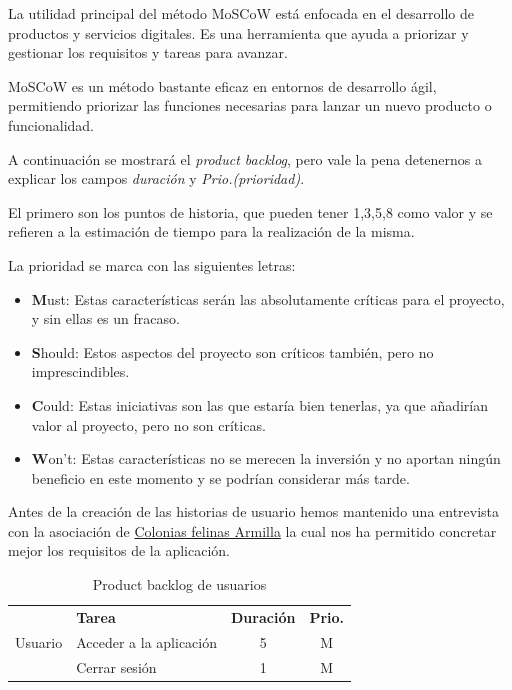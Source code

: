 La utilidad principal del método MoSCoW está enfocada en el desarrollo de productos y servicios digitales. Es una herramienta que ayuda a priorizar y gestionar los requisitos y tareas para avanzar.

MoSCoW es un método bastante eficaz en entornos de desarrollo ágil, permitiendo priorizar las funciones necesarias para lanzar un nuevo producto o funcionalidad.

A continuación se mostrará el \textit{product backlog}, pero vale la pena detenernos a explicar los campos \textit{duración} y \textit{Prio.(prioridad)}.

El primero son los puntos de historia, que pueden tener 1,3,5,8 como valor y se refieren a la estimación de tiempo para la realización de la misma.

La prioridad se marca con las siguientes letras:
\begin{itemize}
	\item  \textbf{M}ust: Estas características serán las absolutamente críticas para el proyecto, y sin ellas es un fracaso.
	\item \textbf{S}hould: Estos aspectos del proyecto son críticos también, pero no imprescindibles.
	\item \textbf{C}ould: Estas iniciativas son las que estaría bien tenerlas, ya que añadirían valor al proyecto, pero no son críticas.
	\item \textbf{W}on't: Estas características no se merecen la inversión y no aportan ningún beneficio en este momento y se podrían considerar más tarde.
\end{itemize}

Antes de la creación de las historias de usuario hemos mantenido una entrevista con la asociación de \href{https://www.instagram.com/coloniasfelinasarmilla/}{Colonias felinas Armilla} la cual nos ha permitido concretar mejor los requisitos de la aplicación.

\begin{table}[H]
	\centering
	\begin{tabular}{|c |p{8cm}|c |c|} \hline 
		\multirow[c]{3}{*}{Usuario}&  \textbf{Tarea}&  \textbf{Duración}& \textbf{Prio.}\\  \cline{2-4}%
		&  Acceder a la aplicación&  5& M\\ \cline{2-4} 
		&  Cerrar sesión&  1& M\\ \hline 
	\end{tabular}
	\caption{Product backlog de usuarios}
	\label{tab:pb_usuarios}
\end{table}

